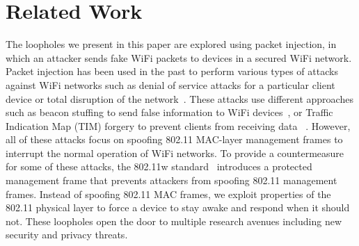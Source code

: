 \section{Related Work}
The loopholes we present in this paper are explored using packet injection, in which an attacker sends fake WiFi packets to devices in a secured WiFi network.
Packet injection has been used in the past to perform various types of attacks against WiFi networks
such as denial of service attacks for a particular client device or total disruption of the network~\cite{vanhoef2020protecting, dos, rogue-ap, deauth}. These attacks use different approaches such as beacon stuffing to send false information to WiFi devices~\cite{beacon-stuffing-1, beacon-stuffing-2}, or Traffic Indication Map (TIM) forgery to prevent clients from receiving data ~\cite{bellardo2003802, tim-forgery}. However, all of these attacks focus on spoofing 802.11 MAC-layer management frames to interrupt the normal operation of WiFi networks. 
To provide a countermeasure for some of these attacks, the 802.11w standard~\cite{ieee802.11w} 
introduces a protected management frame that prevents attackers from spoofing 802.11 management frames. 
Instead of spoofing 802.11 MAC frames, we exploit properties of the 802.11 physical layer to force a device to stay awake and respond when it should not. 
These loopholes open the door to multiple research avenues including new security and privacy threats. 





